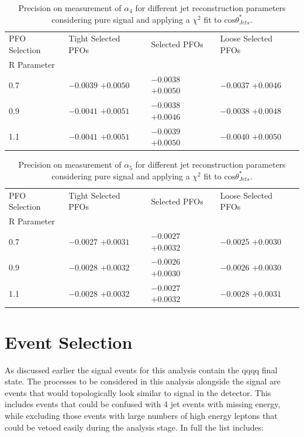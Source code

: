 \begin{table}[h!]
\centering
\begin{tabular}{l l l l}
\hline
PFO Selection & Tight Selected PFOs & Selected PFOs & Loose Selected PFOs \\ 
R Parameter & & & \\ 
\hline
0.7 & $-0.0039$ $+0.0050$ & $-0.0038$ $+0.0050$ & $-0.0037$ $+0.0046$ \\
0.9 & $-0.0041$ $+0.0051$ & $-0.0038$ $+0.0046$ & $-0.0038$ $+0.0048$ \\
1.1 & $-0.0041$ $+0.0051$ & $-0.0039$ $+0.0050$ & $-0.0040$ $+0.0050$ \\
\hline
\end{tabular}
\caption[$1\sigma$ precision on measurement of $\alpha_{4}$ for different jet reconstruction parameters considering pure signal.]{Precision on measurement of $\alpha_{4}$ for different jet reconstruction parameters considering pure signal and applying a $\chi^{2}$ fit to $\text{cos}\theta^{*}_{Jets}$.}
\label{table:precisiona4signaljetalgo}
\end{table}

\begin{table}[h!]
\centering
\begin{tabular}{l l l l}
\hline
PFO Selection & Tight Selected PFOs & Selected PFOs & Loose Selected PFOs \\ 
R Parameter & & & \\ 
\hline
0.7 & $-0.0027$ $+0.0031$ & $-0.0027$ $+0.0032$ & $-0.0025$ $+0.0030$ \\
0.9 & $-0.0028$ $+0.0032$ & $-0.0026$ $+0.0030$ & $-0.0026$ $+0.0030$ \\
1.1 & $-0.0028$ $+0.0032$ & $-0.0027$ $+0.0032$ & $-0.0028$ $+0.0031$ \\
\hline
\end{tabular}
\caption[$1\sigma$ precision on measurement of $\alpha_{5}$ for different jet reconstruction parameters considering pure signal.]{Precision on measurement of $\alpha_{5}$ for different jet reconstruction parameters considering pure signal and applying a $\chi^{2}$ fit to $\text{cos}\theta^{*}_{Jets}$.}
\label{table:precisiona5signaljetalgo}
\end{table}



\section{Event Selection}

As discussed earlier the signal events for this analysis contain the \nu{\nu}qqqq final state. The processes to be considered in this analysis alongside the signal are events that would topologically look similar to signal in the detector. This includes events that could be confused with 4 jet events with missing energy, while excluding those events with large numbers of high energy leptons that could be vetoed easily during the analysis stage. In full the list includes:

